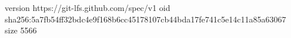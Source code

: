 version https://git-lfs.github.com/spec/v1
oid sha256:5a7fb54ff32bdc4e9f168b6cc45178107cb44bda17fe741c5e14c11a85a63067
size 5566
